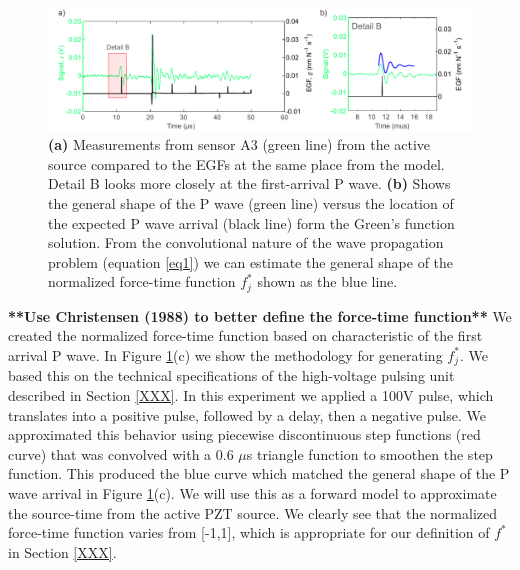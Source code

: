 \documentclass[preprint,3p, 11pt,authoryear]{elsarticle}
\begin{document}
\begin{figure}[ht]
     	\centering
\includegraphics[scale= 0.85]{FIG5.pdf} 
\caption{\textbf{(a)} Measurements from sensor A3 (green line) from the active source compared to the EGFs at the same place from the model.  Detail B looks more closely at the first-arrival P wave. \textbf{(b)} Shows the general shape of the P wave (green line) versus the location of the expected P wave arrival (black line) form the Green's function solution.  From the convolutional nature of the wave propagation problem (equation \eqref{eq1}) we can estimate the general shape of the normalized force-time function $f^{*}_{j}$ shown as the blue line.}
	\label{fig5} 
\end{figure}

\textbf{**Use Christensen (1988) to better define the force-time function**} We created the normalized force-time function based on characteristic of the first arrival P wave.  In Figure \ref{fig5}(c) we show the methodology for generating $f^{*}_{j}$.  We based this on the technical specifications of the high-voltage pulsing unit described in Section \ref{XXX}. In this experiment we applied a 100V pulse, which translates into a positive pulse, followed by a delay, then a negative pulse.  We approximated this behavior using piecewise discontinuous step functions (red curve) that was convolved with a 0.6 $\mu$s triangle function to smoothen the step function. This produced the blue curve which matched the general shape of the P wave arrival in Figure \ref{fig5}(c).  We will use this as a forward model to approximate the source-time from the active PZT source. We clearly see that the normalized force-time function varies from [-1,1], which is appropriate for our definition of $f^{*}$ in Section \ref{XXX}.
\end{document}
